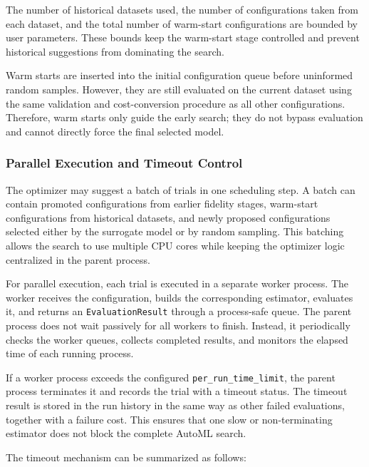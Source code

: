 \documentclass[12pt,a4paper]{report}
\begin{document}
\noindent The number of historical datasets used, the number of configurations taken from
each dataset, and the total number of warm-start configurations are bounded by
user parameters. These bounds keep the warm-start stage controlled and prevent
historical suggestions from dominating the search.

\noindent Warm starts are inserted into the initial configuration queue before uninformed
random samples. However, they are still evaluated on the current dataset using
the same validation and cost-conversion procedure as all other configurations.
Therefore, warm starts only guide the early search; they do not bypass
evaluation and cannot directly force the final selected model.

\subsubsection{Parallel Execution and Timeout Control}

The optimizer may suggest a batch of trials in one scheduling step. A batch can
contain promoted configurations from earlier fidelity stages, warm-start
configurations from historical datasets, and newly proposed configurations
selected either by the surrogate model or by random sampling. This batching
allows the search to use multiple CPU cores while keeping the optimizer logic
centralized in the parent process.

\noindent For parallel execution, each trial is executed in a separate worker process. The
worker receives the configuration, builds the corresponding estimator, evaluates
it, and returns an \texttt{EvaluationResult} through a process-safe queue. The
parent process does not wait passively for all workers to finish. Instead, it
periodically checks the worker queues, collects completed results, and monitors
the elapsed time of each running process.

\noindent If a worker process exceeds the configured
\texttt{per\_run\_time\_limit}, the parent process terminates it and records the
trial with a timeout status. The timeout result is stored in the run history in
the same way as other failed evaluations, together with a failure cost. This
ensures that one slow or non-terminating estimator does not block the complete
AutoML search.

\noindent The timeout mechanism can be summarized as follows:
\end{document}
